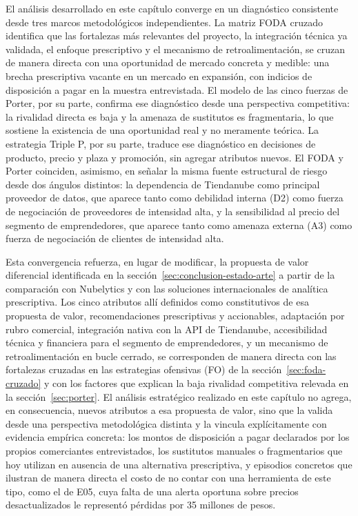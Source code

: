 El análisis desarrollado en este capítulo converge en un diagnóstico consistente desde tres marcos metodológicos independientes. La matriz FODA cruzado identifica que las fortalezas más relevantes del proyecto, la integración técnica ya validada, el enfoque prescriptivo y el mecanismo de retroalimentación, se cruzan de manera directa con una oportunidad de mercado concreta y medible: una brecha prescriptiva vacante en un mercado en expansión, con indicios de disposición a pagar en la muestra entrevistada. El modelo de las cinco fuerzas de Porter, por su parte, confirma ese diagnóstico desde una perspectiva competitiva: la rivalidad directa es baja y la amenaza de sustitutos es fragmentaria, lo que sostiene la existencia de una oportunidad real y no meramente teórica. La estrategia Triple P, por su parte, traduce ese diagnóstico en decisiones de producto, precio y plaza y promoción, sin agregar atributos nuevos. El FODA y Porter coinciden, asimismo, en señalar la misma fuente estructural de riesgo desde dos ángulos distintos: la dependencia de Tiendanube como principal proveedor de datos, que aparece tanto como debilidad interna (D2) como fuerza de negociación de proveedores de intensidad alta, y la sensibilidad al precio del segmento de emprendedores, que aparece tanto como amenaza externa (A3) como fuerza de negociación de clientes de intensidad alta.

Esta convergencia refuerza, en lugar de modificar, la propuesta de valor diferencial identificada en la sección~\ref{sec:conclusion-estado-arte} a partir de la comparación con Nubelytics y con las soluciones internacionales de analítica prescriptiva. Los cinco atributos allí definidos como constitutivos de esa propuesta de valor, recomendaciones prescriptivas y accionables, adaptación por rubro comercial, integración nativa con la API de Tiendanube, accesibilidad técnica y financiera para el segmento de emprendedores, y un mecanismo de retroalimentación en bucle cerrado, se corresponden de manera directa con las fortalezas cruzadas en las estrategias ofensivas (FO) de la sección~\ref{sec:foda-cruzado} y con los factores que explican la baja rivalidad competitiva relevada en la sección~\ref{sec:porter}. El análisis estratégico realizado en este capítulo no agrega, en consecuencia, nuevos atributos a esa propuesta de valor, sino que la valida desde una perspectiva metodológica distinta y la vincula explícitamente con evidencia empírica concreta: los montos de disposición a pagar declarados por los propios comerciantes entrevistados, los sustitutos manuales o fragmentarios que hoy utilizan en ausencia de una alternativa prescriptiva, y episodios concretos que ilustran de manera directa el costo de no contar con una herramienta de este tipo, como el de E05, cuya falta de una alerta oportuna sobre precios desactualizados le representó pérdidas por 35 millones de pesos.

